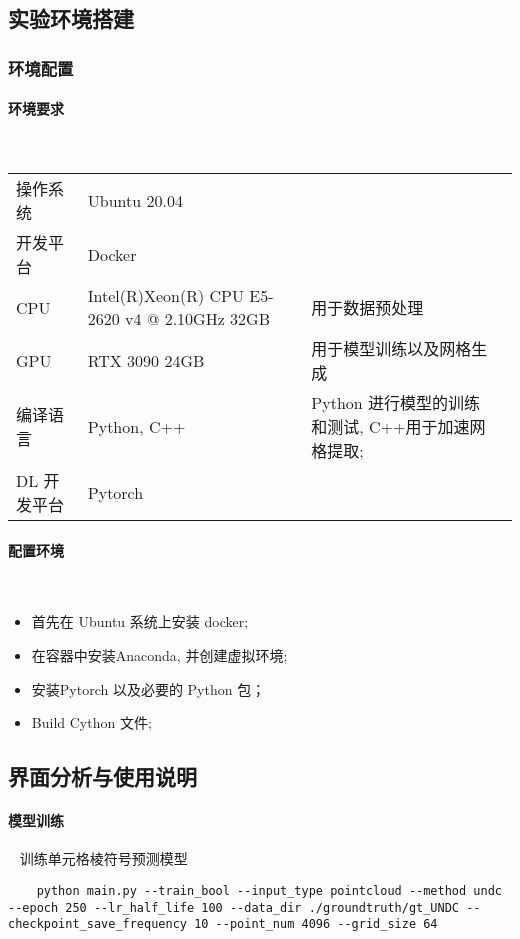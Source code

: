 \subsection{实验环境搭建}
\subsubsection{环境配置}
\paragraph{环境要求}~{}
\begin{table}[h]
    \centering
    \begin{tabularx}{\textwidth}{X X X X}
		操作系统 & Ubuntu 20.04 & \\
		开发平台 & Docker & \\
		CPU & Intel(R)Xeon(R) CPU E5-2620 v4 @ 2.10GHz 32GB & 用于数据预处理 \\
		GPU & RTX 3090 24GB & 用于模型训练以及网格生成 \\
		编译语言 & Python, C++ & Python 进行模型的训练和测试, C++用于加速网格提取; \\
		DL 开发平台 & Pytorch & \\
    \end{tabularx}
\end{table}


\paragraph{配置环境}~{}
\begin{itemize}
	\item 首先在 Ubuntu 系统上安装 docker;
	\item 在容器中安装Anaconda, 并创建虚拟环境;
	\item 安装Pytorch 以及必要的 Python 包；
	\item Build Cython 文件;
\end{itemize}

\subsection{界面分析与使用说明}
\paragraph{模型训练}~{}
训练单元格棱符号预测模型
\lstset{language=bash}
\begin{lstlisting}
    python main.py --train_bool --input_type pointcloud --method undc --epoch 250 --lr_half_life 100 --data_dir ./groundtruth/gt_UNDC --checkpoint_save_frequency 10 --point_num 4096 --grid_size 64 
\end{lstlisting}

